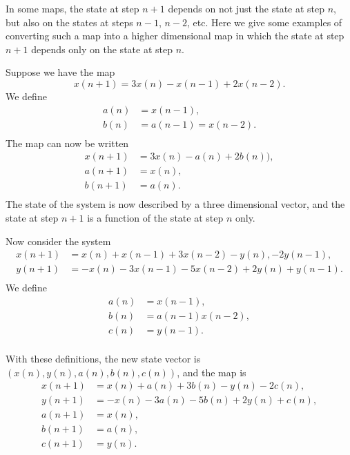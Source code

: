 In some maps, the state at step $n+1$ depends on not just the state at step $n$,
but also on the states at steps $n-1$, $n-2$, etc.
Here we give some examples of
converting such a map into a higher dimensional map in which the state at
step $n+1$ depends only on the state at step $n$.
\begin{xexample}
Suppose we have the map
\begin{equation}
   x(n+1) = 3x(n)-x(n-1)+2x(n-2).
\end{equation}
We define
\begin{equation}
\begin{split}
   a(n) & = x(n-1), \\
   b(n) & = a(n-1) = x(n-2). \\
\end{split}
\end{equation}
The map can now be written
\begin{equation}
\begin{split}
   x(n+1) & = 3x(n)-a(n)+2b(n)), \\
   a(n+1) & = x(n), \\
   b(n+1) & = a(n). \\
\end{split}
\end{equation}
The state of the system is now described by a three dimensional vector,
and the state at step $n+1$ is a function of the state at step $n$ only.
\end{xexample}
\begin{xexample}
Now consider the system
\begin{equation}
\begin{split}
   x(n+1) & = x(n)+x(n-1)+3x(n-2)-y(n),-2y(n-1), \\
   y(n+1) & = -x(n)-3x(n-1)-5x(n-2)+2y(n)+y(n-1). \\
\end{split}
\end{equation}
We define
\begin{equation}
\begin{split}
   a(n) & = x(n-1), \\
   b(n) & = a(n-1) x(n-2), \\
   c(n) & = y(n-1). \\
\end{split}
\end{equation}


With these definitions,
the new state vector is $(x(n),y(n),a(n),b(n),c(n))$, and the map is
\begin{equation}
\begin{split}
   x(n+1) & = x(n) + a(n) + 3b(n) - y(n) - 2c(n), \\
   y(n+1) & = -x(n) - 3a(n) - 5b(n) + 2y(n) + c(n), \\
   a(n+1) & = x(n), \\
   b(n+1) & = a(n), \\
   c(n+1) & = y(n).
\end{split}
\end{equation}
\end{xexample}

